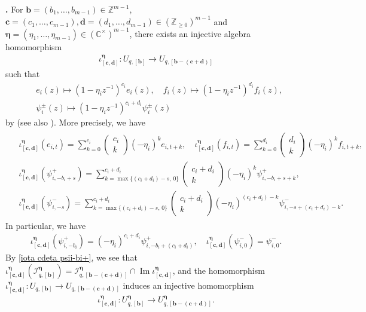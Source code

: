 \documentclass[12pt]{amsart}
\def \para{\refstepcounter{thm} \par\medskip\noindent
                \textbf{\thethm .} }
\numberwithin{equation}{thm}
\newcommand\CC{\mathbb C}
\newcommand\ZZ{\mathbb Z}
\newcommand\bb{\mathbf b}
\newcommand\bc{\mathbf c}
\newcommand\bd{\mathbf d}
\newcommand\cI{\mathcal{I}}
\newcommand\Be{\boldsymbol\eta}
\newcommand\ra{\rightarrow}
\renewcommand\Im{\operatorname{Im}}
\begin{document}
\para 
For $\bb =(b_1,\dots, b_{m-1}) \in \ZZ^{m-1}$, 
$\bc =(c_1,\dots, c_{m-1}), \bd=(d_1,\dots, d_{m-1}) \in (\ZZ_{\geq 0})^{m-1}$ 
and $\Be =( \eta_1, \dots, \eta_{m-1}) \in (\CC^{\times})^{m-1}$, 
there exists an injective algebra homomorphism 
\begin{align*}
\iota^{\Be}_{[\bc, \bd]} : U_{q,[\bb]} \ra U_{q,[\bb - (\bc+ \bd)]}
\end{align*} 
such that 
\begin{align*}
&e_i(z) \mapsto (1 - \eta_i  z^{-1})^{c_i} e_i(z), 
\quad 
f_i(z) \mapsto (1 - \eta_i  z^{-1})^{d_i} f_i(z), 
\\
&\psi_i^{\pm}(z) \mapsto (1- \eta_i  z^{-1})^{c_i + d_i} \psi_i^{\pm} (z) 
\end{align*}
by \cite[Lemma 10.18, Theorem 10.19]{FT19} (see also \cite[\S 4.5]{Her23}). 
More precisely, we have 
\begin{align}
\label{exp iotacdeta}
\begin{split}
&\iota_{[\bc, \bd]}^{\Be} (e_{i,t}) = \sum_{k=0}^{c_i} \begin{pmatrix} c_i \\ k \end{pmatrix} (-\eta_i)^k e_{i, t+k}, 
	\quad 
\iota_{[\bc, \bd]}^{\Be} (f_{i,t} ) = \sum_{k=0}^{d_i} \begin{pmatrix} d_i \\ k \end{pmatrix} ( - \eta_i)^k f_{i, t+k}, 
\\
& \iota_{[\bc, \bd]}^{\Be} (\psi_{i, -b_i +s}^+) 
	= \sum_{ k = \max \{ (c_i+d_i) - s, \, 0\}}^{c_i+d_i} 
	\begin{pmatrix} c_i + d_i \\ k \end{pmatrix} (- \eta_i)^k \psi_{i, -b_i +s +k}^+, 
\\
& \iota_{[\bc, \bd]}^{\Be} ( \psi_{i, - s}^-) 
	= \sum_{k= \max\{(c_i + d_i) - s, \, 0\}}^{c_i+d_i} \begin{pmatrix} c_i + d_i \\ k \end{pmatrix} 
	(- \eta_i)^{(c_i+d_i) -k} \psi_{i, - s+ (c_i+d_i) -k}^-. 
\end{split}
\end{align}
In particular, we have 
\begin{align}
\label{iota cdeta psii-bi+}
\iota_{[\bc, \bd]}^{\Be} ( \psi_{i, -b_i}^+)= ( - \eta_i )^{c_i+d_i} \psi_{i, - b_i + (c_i+d_i)}^+, 
\quad 
\iota_{[\bc, \bd]}^{\Be} (\psi_{i,0}^-) = \psi_{i,0}^-. 
\end{align}
By \eqref{iota cdeta psii-bi+}, we see that 
$\iota_{[\bc,\bd]}^{\Be} ( \cI_{q,[\bb]}^{\Be}) = \cI_{q,[\bb-(\bc+\bd)]}^{\Be} \cap \Im \iota_{[\bc, \bd]}^{\Be}$, 
and the homomorphism $\iota_{[\bc, \bd]}^{\Be} : U_{q,[\bb]} \ra U_{q, [\bb-(\bc+ \bd)]}$ induces an injective homomorphism 
\begin{align*}
\iota_{[\bc,\bd]}^{\Be} : U_{q,[\bb]}^{\Be} \ra U_{q,[\bb - (\bc+\bd)]}^{\Be}. 
\end{align*}
\end{document}
